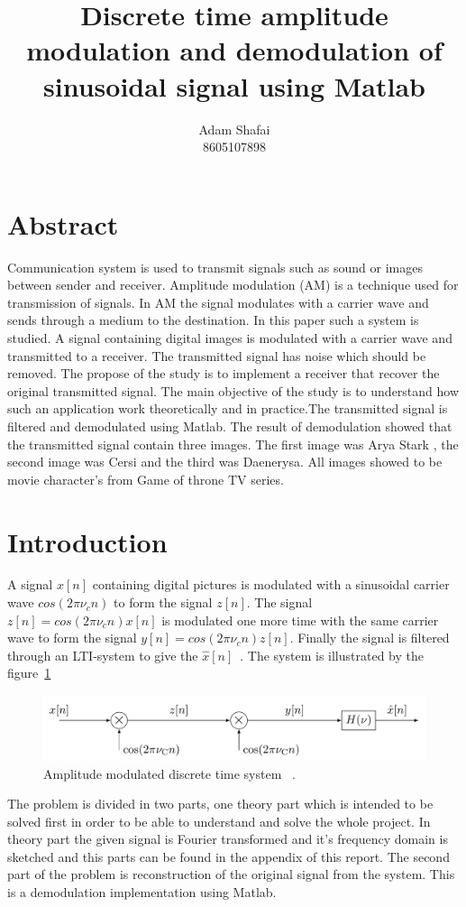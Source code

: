 \documentclass[a4paper,twocolumn]{article}
\begin{document}
\title{Discrete time amplitude modulation and demodulation of sinusoidal signal using Matlab}
\author{Adam Shafai\\ 8605107898}
\maketitle
\section*{Abstract}
\label{sec:sammanfattning}
Communication system is used to transmit signals such as sound or images between sender and receiver.
Amplitude modulation (AM) is a technique used for transmission of signals. In AM the signal modulates with a carrier wave and sends through a medium to the destination. In this paper such a system is studied. A signal containing digital images is modulated with a carrier wave and transmitted to a receiver. The transmitted signal has noise which should be removed. The propose of the study is to implement a receiver that recover the original transmitted signal. The main objective of the study is to understand how such an application work theoretically and in practice.The transmitted signal is filtered and demodulated using Matlab. The result of demodulation showed that the transmitted signal contain three images. The first image was Arya Stark , the second image was Cersi and the third was Daenerysa. All images showed to be movie character's from Game of throne TV series. 


\section{Introduction}
\label{sec:intro}
A signal $x[n]$ containing digital pictures is modulated with a sinusoidal carrier wave $cos(2\pi \nu_cn)$ to form the signal $z[n]$. The signal  $z[n] = cos(2\pi \nu_cn)x[n]$ is modulated one more time with the same carrier wave to form the signal $y[n] = cos(2\pi \nu_cn)z[n]$. Finally the signal is filtered through an LTI-system to give the $\hat{x}[n]$~\cite{pek}. The system is illustrated by the figure~\ref{fig:pic1}
\begin{figure}[H]
  \begin{center}
    \includegraphics[width=0.83\columnwidth]{pic1.png}
  \end{center}
  \caption{Amplitude modulated discrete time system ~\cite{pek}.}
  \label{fig:pic1}
\end{figure}
\noindent
The problem is divided in two parts, one theory part which is intended to be solved first in order to be able to understand and solve the whole project.
In theory part the given signal is Fourier transformed and it's frequency domain is sketched and this parts can be found in the appendix of this report.
The second part of the problem is reconstruction of the original signal from the system. This is a demodulation implementation using Matlab.
\end{document}
